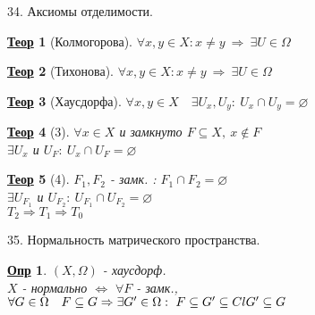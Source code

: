 \documentclass[12pt, fleqn]{article}
\newenvironment{question}[1]{\hspace*{-4em} #1}{\newpage}
\newcommand{\ra}{\Rightarrow}
\newcommand{\rla}{\Leftrightarrow}
\newcommand{\q}{\quad}
\theoremstyle{nonumbermarginbreak}
\newtheorem{theorem}{\hspace*{-2em}\underline{\bfseries Теор}}[section]
\newtheorem{definition}{\hspace*{-2em}\underline{\bfseries Опр}}[section]
\begin{document}
    \begin{question}{34. Аксиомы отделимости.}
        \begin{theorem} [Колмогорова]
            $\forall x, y \in X: x \neq y \ \ra \ \exists U \in \Omega$
        \end{theorem}

        \begin{theorem} [Тихонова] 
            $\forall x, y \in X: x \neq y \ \ra \ \exists U \in \Omega$
        \end{theorem}

        \begin{theorem} [Хаусдорфа]
            $\forall x, y \in X \q \exists U_x, U_y: \ U_x \cap U_y = \varnothing$
        \end{theorem}

        \begin{theorem} [3]
            $\forall x \in X$ и замкнуто $F \subseteq X, \  x \not \in F$\\
            $\exists U_x$ и $U_F : \ U_x \cap U_F = \varnothing$
        \end{theorem}

        \begin{theorem} [4]
            $F_1, F_2$ - замк. : $F_1 \cap F_2 = \varnothing$\\
            $\exists U_{F_1}$ и $U_{F_2}: \ U_{F_1} \cap U_{F_2} = \varnothing$\\
            $T_2 \ra T_1 \ra T_0$
        \end{theorem}
    \end{question}

    \begin{question}{35. Нормальность матрического пространства.}
        \begin{definition} 
            $(X, \Omega)$ - хаусдорф.\\
            $X$ - нормально $\rla$ $\forall F$ - замк., $\forall G \in \Omega \q F \subseteq G \ra 
            \exists G' \in \Omega:\\ \ F \subseteq G' \subseteq Cl G' \subseteq G$
        \end{definition}
    \end{question}
\end{document}
